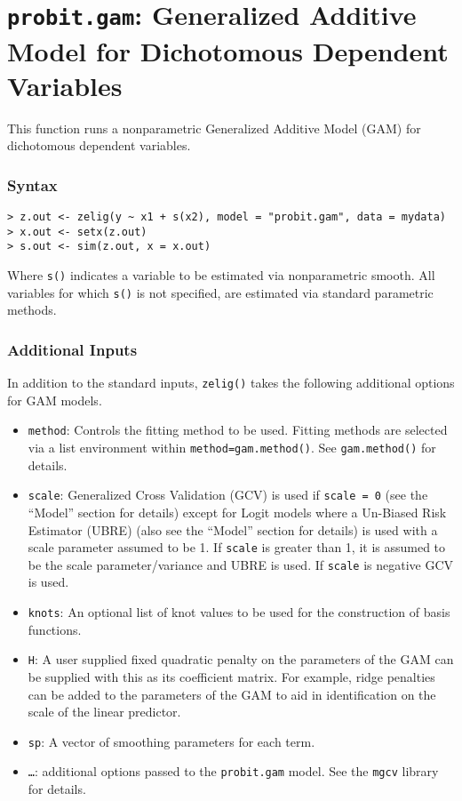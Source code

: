 \section{{\tt probit.gam}: Generalized Additive Model for Dichotomous Dependent Variables}

This function runs a nonparametric Generalized Additive Model (GAM) for dichotomous dependent variables. 

\subsubsection{Syntax}
\begin{verbatim}
> z.out <- zelig(y ~ x1 + s(x2), model = "probit.gam", data = mydata) 
> x.out <- setx(z.out)
> s.out <- sim(z.out, x = x.out)
\end{verbatim}
Where {\tt s()} indicates a variable to be estimated via nonparametric smooth. All variables for which  {\tt s()} is not specified, are estimated via standard parametric methods. 

\subsubsection{Additional Inputs}
In addition to the standard inputs, {\tt zelig()} takes the following additional options for GAM models.
\begin{itemize}
\item {\tt method}: Controls the fitting method to be used. Fitting methods are selected via a list environment within {\tt method=gam.method()}. See {\tt gam.method()} for details. 
\item {\tt scale}:  Generalized Cross Validation (GCV) is used if {\tt scale = 0} (see the ``Model'' section for details) except for Logit models where a Un-Biased Risk Estimator (UBRE) (also see the ``Model'' section for details) is used with a scale parameter assumed to be 1. If {\tt scale} is greater than 1, it is assumed to be the scale parameter/variance and UBRE is used. If {\tt scale} is negative GCV is used.
\item {\tt knots}: An optional list of knot values to be used for the construction of basis functions. 
\item {\tt H}: A user supplied fixed quadratic penalty on the parameters of the GAM can be supplied with this as its coefficient matrix. For example, ridge penalties can be added to the parameters of the GAM to aid in identification on the scale of the linear predictor.
\item {\tt sp}: A vector of smoothing parameters for each term.
\item {\tt \ldots}: additional options passed to the {\tt probit.gam} model. See the {\tt mgcv} library for details. 
\end{itemize}


